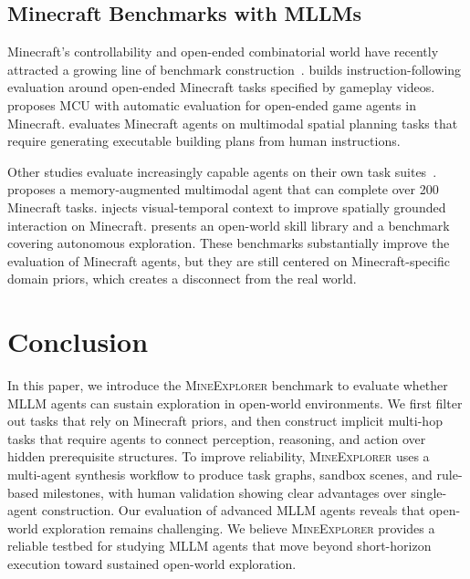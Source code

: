 \documentclass[11pt]{article}
\begin{document}
\subsection{Minecraft Benchmarks with MLLMs}

Minecraft's controllability and open-ended combinatorial world have recently attracted a growing line of benchmark construction~\citep{MineDojo, BEDD, MC, MCU}. 
\citet{GROOT} builds instruction-following evaluation around open-ended Minecraft tasks specified by gameplay videos. 
\citet{MCU} proposes MCU with automatic evaluation for open-ended game agents in Minecraft. 
\citet{MineAnyBuild} evaluates Minecraft agents on multimodal spatial planning tasks that require generating executable building plans from human instructions. 

Other studies evaluate increasingly capable agents on their own task suites~\citep{OmniJARVIS, JARVIS-VLA, Odyssey}. 
\citet{JARVIS-1} proposes a memory-augmented multimodal agent that can complete over 200 Minecraft tasks. 
\citet{ROCKET-1} injects visual-temporal context to improve spatially grounded interaction on Minecraft.
\citet{Odyssey} presents an open-world skill library and a benchmark covering autonomous exploration. 
These benchmarks substantially improve the evaluation of Minecraft agents, but they are still centered on Minecraft-specific domain priors, which creates a disconnect from the real world.

\section{Conclusion}

In this paper, we introduce the \textsc{MineExplorer} benchmark to evaluate whether MLLM agents can sustain exploration in open-world environments. 
We first filter out tasks that rely on Minecraft priors, and then construct implicit multi-hop tasks that require agents to connect perception, reasoning, and action over hidden prerequisite structures. 
To improve reliability, \textsc{MineExplorer} uses a multi-agent synthesis workflow to produce task graphs, sandbox scenes, and rule-based milestones, with human validation showing clear advantages over single-agent construction. 
Our evaluation of advanced MLLM agents reveals that open-world exploration remains challenging. 
We believe \textsc{MineExplorer} provides a reliable testbed for studying MLLM agents that move beyond short-horizon execution toward sustained open-world exploration.
\end{document}
